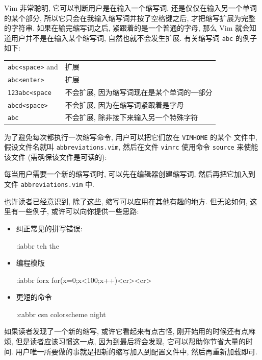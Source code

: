 Vim 非常聪明, 它可以判断用户是在输入一个缩写词, 还是仅仅在输入另一个单词
的某个部分, 所以它只会在我输入缩写词并按了空格键之后, 才把缩写扩展为完整
的字符串. 如果在输完缩写词之后, 紧跟着的是一个普通的字母, 那么 Vim 就会知
道用户并不是在输入某个缩写词, 自然也就不会发生扩展. 有关缩写词 \texttt{abc} 
的例子如下:
\begin{center}
\begin{tabular}{ll}
    \hline
    \texttt{abc<space>} and & 扩展 \\
    \texttt{abc<enter>}     & 扩展 \\
    \texttt{123abc<space}   & 不会扩展, 因为缩写词现在是某个单词的一部分 \\
    \texttt{abcd<space>}    & 不会扩展, 因为在缩写词紧跟着是字母 \\
    \texttt{abc}            & 不会扩展, 除非接下来输入另一个特殊字符 \\
    \hline
\end{tabular}
\end{center}

为了避免每次都执行一次缩写命令, 用户可以把它们放在 \texttt{VIMHOME} 的某个 
文件中, 假设文件名就叫 \texttt{abbreviations.vim}, 然后在文件 \texttt{vimrc}
使用命令 \texttt{source} 来使能该文件 (需确保该文件是可读的):

每当用户需要一个新的缩写词时, 可以先在编辑器创建缩写词, 然后再把它加入到文件
\texttt{abbreviations.vim} 中.

也许读者已经意识到, 除了这些, 缩写可以应用在其他有趣的地方. 但无论如何,
这里有一些例子, 或许可以向你提供一些思路:
\begin{itemize}
    \item 纠正常见的拼写错误:
    \begin{vimcmd}
    :iabbr teh the
    \end{vimcmd}
    \item 编程模版
    \begin{vimcmd}
    :iabbr forx for(x=0;x<100;x++){<cr><cr>}
    \end{vimcmd}
    \item 更短的命令
    \begin{vimcmd}
    :cabbr csn colorscheme night
    \end{vimcmd}
\end{itemize}

如果读者发现了一个新的缩写, 或许它看起来有点古怪, 刚开始用的时候还有点麻烦,
但是读者应该习惯这一点, 因为到最后将会发现, 它可以帮助你节省大量的时间.
用户唯一所要做的事就是把新的缩写加入到配置文件中, 然后再重新加载即可.

